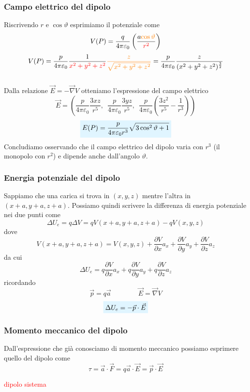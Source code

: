 \documentclass[x11names]{report}
\begin{document}
\subsubsection{Campo elettrico del dipolo}
Riscrivendo \(r\) e \(\cos\vartheta\) esprimiamo il potenziale come
\[
V(P) = \frac{q}{4\pi \varepsilon_0} \left(\frac{a\textcolor{orange}{\cos\vartheta}}{\textcolor{red}{r^2}}\right) 
\]
\[
V(P)= \frac{p}{4\pi\varepsilon_0}\frac{1}{\textcolor{red}{x^2 + y^2 + z^2}}\textcolor{orange}{\frac{z}{\sqrt{x^2 + y^2 + z^2}}} = \frac{p}{4\pi\varepsilon_0}\frac{z}{(x^2+y^2+z^2)^{\frac{3}{2}}}
\]\\

\noindent
Dalla relazione \(\vec{E} = -\vec{\nabla}V\) otteniamo l'espressione del campo elettrico
\[
\vec{E} = \left( \frac{p}{4\pi\varepsilon_0}\frac{3xz}{r^5},\;\ \frac{p}{4\pi\varepsilon_0}\frac{3yz}{r^5},\;\ \frac{p}{4\pi\varepsilon_0}\left(\frac{3z^2}{r^5}-\frac{1}{r^3}\right)\right) 
\]
\begin{equation}
	\viola{E(P) = \frac{p}{4\pi\varepsilon_0r^3}\sqrt{3\cos^2\vartheta + 1}}
\end{equation}
Concludiamo osservando che il campo elettrico del dipolo varia con \(r^3\) (il monopolo con \(r^2\)) e dipende anche dall'angolo \(\vartheta\).

\subsubsection{Energia potenziale del dipolo}
Sappiamo che una carica si trova in \((x,y,z)\) mentre l'altra in \((x+a,y+a,z+a)\). Possiamo quindi scrivere la differenza di energia potenziale nei due punti come 
\[
	\Delta U_e = q\Delta V = qV(x+a,y+a,z+a) - qV(x,y,z)
\]
dove
\[
	V(x+a,y+a,z+a) = V(x,y,z) + \frac{\partial V}{\partial x}a_x + \frac{\partial V}{\partial y}a_y + \frac{\partial V}{\partial z}a_z
\]
da cui 
\[
	\Delta U_e = q\frac{\partial V}{\partial x}a_x + q\frac{\partial V}{\partial y}a_y + q\frac{\partial V}{\partial z}a_z
\]
ricordando
\[
	\boxed{\vec{p} = q\vec{a}} \qquad \qquad \boxed{\vec{E} = \vec{\nabla}V}
\]
\begin{equation}
	\viola{\Delta U_e = -\vec{p} \cdot \vec{E}}
\end{equation}

\subsubsection{Momento meccanico del dipolo}
Dall'espressione che già conosciamo di momento meccanico possiamo esprimere quello del dipolo come
\[
	\tau = \vec{a}\cdot\vec{F} = q\vec{a}\cdot\vec{E} = \vec{p}\cdot\vec{E}
\]
\begin{center}
	\textcolor{red}{dipolo sistema}
\end{center}
\end{document}
